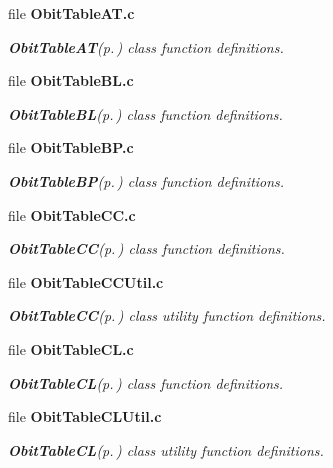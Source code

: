 \begin{CompactItemize}
\item 
file {\bf Obit\-Table\-AT.c}
\begin{CompactList}\small\item\em {\bf Obit\-Table\-AT}{\rm (p.\,\pageref{structObitTableAT})} class function definitions. \item\end{CompactList}

\item 
file {\bf Obit\-Table\-BL.c}
\begin{CompactList}\small\item\em {\bf Obit\-Table\-BL}{\rm (p.\,\pageref{structObitTableBL})} class function definitions. \item\end{CompactList}

\item 
file {\bf Obit\-Table\-BP.c}
\begin{CompactList}\small\item\em {\bf Obit\-Table\-BP}{\rm (p.\,\pageref{structObitTableBP})} class function definitions. \item\end{CompactList}

\item 
file {\bf Obit\-Table\-CC.c}
\begin{CompactList}\small\item\em {\bf Obit\-Table\-CC}{\rm (p.\,\pageref{structObitTableCC})} class function definitions. \item\end{CompactList}

\item 
file {\bf Obit\-Table\-CCUtil.c}
\begin{CompactList}\small\item\em {\bf Obit\-Table\-CC}{\rm (p.\,\pageref{structObitTableCC})} class utility function definitions. \item\end{CompactList}

\item 
file {\bf Obit\-Table\-CL.c}
\begin{CompactList}\small\item\em {\bf Obit\-Table\-CL}{\rm (p.\,\pageref{structObitTableCL})} class function definitions. \item\end{CompactList}

\item 
file {\bf Obit\-Table\-CLUtil.c}
\begin{CompactList}\small\item\em {\bf Obit\-Table\-CL}{\rm (p.\,\pageref{structObitTableCL})} class utility function definitions. \item\end{CompactList}


\end{CompactItemize}
